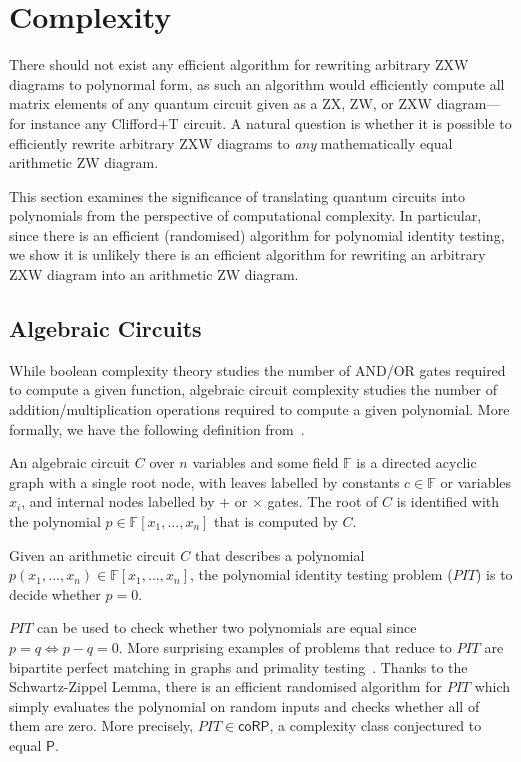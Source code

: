 \section{Complexity}

There should not exist any efficient algorithm for rewriting arbitrary ZXW diagrams to polynormal form, as such an algorithm would efficiently compute all matrix elements of any quantum circuit given as a ZX, ZW, or ZXW diagram---for instance any Clifford+T circuit. A natural question is whether it is possible to efficiently rewrite arbitrary ZXW diagrams to \emph{any} mathematically equal arithmetic ZW diagram.

This section examines the significance of translating quantum circuits into polynomials from the perspective of computational complexity.
In particular, since there is an efficient (randomised) algorithm for polynomial identity testing, we show it is unlikely there is an efficient algorithm for rewriting an arbitrary ZXW diagram into an arithmetic ZW diagram.

\subsection{Algebraic Circuits}

While boolean complexity theory studies the number of AND/OR gates required to compute a given function, algebraic circuit complexity studies the number of addition/multiplication operations required to compute a given polynomial. More formally, we have the following definition from~\cite{shpilka2010arithmetic}.

\begin{definition}
	An algebraic circuit $C$ over $n$ variables and some field $\mathbb{F}$ is a directed acyclic graph with a single root node, with leaves labelled by constants $c \in \mathbb{F}$ or variables $x_i$, and internal nodes labelled by $+$ or $\times$ gates. The root of $C$ is identified with the polynomial $p \in \mathbb{F}[x_1, ..., x_n]$ that is computed by $C$.
\end{definition}


\begin{definition}
    Given an arithmetic circuit $C$ that describes a polynomial $p(x_1, ..., x_n) \in \mathbb{F}[x_1, ..., x_n]$, the polynomial identity testing problem ($PIT$) is to decide whether $p = 0$.
\end{definition}

$PIT$ can be used to check whether two polynomials are equal since $p = q \iff p-q = 0$. More surprising examples of problems that reduce to $PIT$ are bipartite perfect matching in graphs and primality testing~\cite{saxena2009progress}. Thanks to the Schwartz-Zippel Lemma, there is an efficient randomised algorithm for $PIT$ which simply evaluates the polynomial on random inputs and checks whether all of them are zero. More precisely, $PIT \in \mathsf{coRP}$, a complexity class conjectured to equal $\mathsf{P}$.

